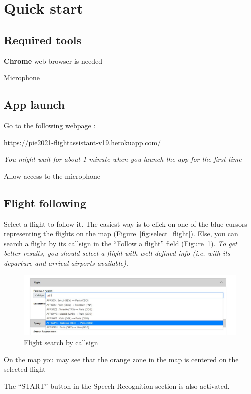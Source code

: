 \documentclass[12pt,oneside,a4]{article}
\let\tempone\itemize
\let\temptwo\enditemize
\renewenvironment{itemize}{\tempone\addtolength{\itemsep}{-0.5\baselineskip}}{\temptwo}
\newcommand{\linkdeploy}{https://pie2021-flightassistant-v19.herokuapp.com/}
\begin{document}
\section{Quick start}

\subsection{Required tools}
\begin{itemize}
    \item \textbf{Chrome} web browser is needed
    \item Microphone
\end{itemize}

\subsection{App launch}
\begin{itemize}
    \item Go to the following webpage : 
    \begin{center}
        \vspace{-.4em}
        \url{\linkdeploy}
    \end{center}
    \textit{You might wait for about 1 minute when you launch the app for the first time}
    \item Allow access to the microphone
\end{itemize}

\subsection{Flight following}

\begin{itemize}
    \item Select a flight to follow it. The easiest way is to click on one of the blue cursors representing the flights on the map (Figure~\ref{fig:select_flight}). 
    Else, you can search a flight by its callsign in the ``Follow a flight'' field (Figure~\ref{fig:search_flight}).
    \textit{To get better results, you should select a flight with well-defined info (i.e. with its departure and arrival airports available).}
    
    \begin{figure}[h!]
        \centering
        \includegraphics[width=.9\linewidth]{search_flight.jpg}
        \caption{Flight search by callsign}
        \label{fig:search_flight}
    \end{figure}
    \item On the map you may see that the orange zone in the map is centered on the selected flight
    \item The ``START'' button in the Speech Recognition section is also activated.
\end{itemize}
\end{document}
